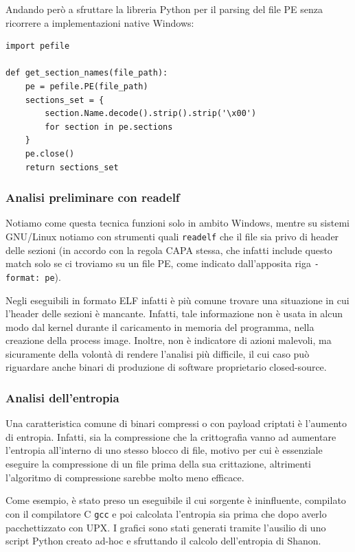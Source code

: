 \bigskip

Andando però a sfruttare la libreria Python per il parsing del file PE senza ricorrere a implementazioni native Windows:

\begin{verbatim}
import pefile

def get_section_names(file_path):
    pe = pefile.PE(file_path)
    sections_set = {
        section.Name.decode().strip().strip('\x00')
        for section in pe.sections
    }
    pe.close()
    return sections_set
\end{verbatim}

\subsubsection{Analisi preliminare con readelf}
Notiamo come questa tecnica funzioni solo in ambito Windows, mentre su sistemi GNU/Linux notiamo con strumenti quali \texttt{readelf} che il file sia privo di header delle sezioni
(in accordo con la regola CAPA stessa, che infatti include questo match solo se ci troviamo su un file PE, come indicato dall'apposita riga \texttt{- format: pe}).

Negli eseguibili in formato ELF infatti è più comune trovare una situazione in cui l'header delle sezioni è mancante. Infatti, tale informazione non è usata in alcun modo dal kernel durante il caricamento in memoria del programma, nella creazione della process image. Inoltre, non è indicatore di azioni malevoli, ma sicuramente della volontà di rendere l'analisi più difficile, il cui caso può riguardare anche binari di produzione di software proprietario closed-source.

\subsubsection{Analisi dell'entropia}
Una caratteristica comune di binari compressi o con payload criptati è l'aumento di entropia. Infatti, sia la compressione che la crittografia vanno ad aumentare l'entropia all'interno di uno stesso blocco di file, motivo per cui è essenziale eseguire la compressione di un file prima della sua crittazione, altrimenti l'algoritmo di compressione sarebbe molto meno efficace.

Come esempio, è stato preso un eseguibile il cui sorgente è ininfluente, compilato con il compilatore C \texttt{gcc} e poi calcolata l'entropia sia prima che dopo averlo pacchettizzato con UPX. I grafici sono stati generati tramite l'ausilio di uno script Python creato ad-hoc e sfruttando il calcolo dell'entropia di Shanon.

